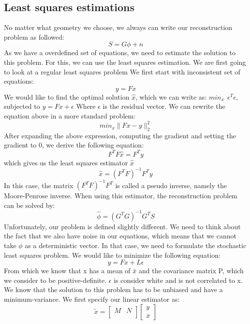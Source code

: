 \documentclass{article}
\begin{document}
\subsection{Least squares estimations}
No matter what geometry we choose, we always can write our reconstruction problem as followed:
$$ S=G\phi +n$$
As we have a overdefined set of equations, we need to estimate the solution to this problem. For this, we can use the least squares estimation. We are first going to look at a regular least squares problem
\newline
\newline
We first start with inconsistent set of equations:
$$ y=Fx $$
We would like to find the optimal solution $\hat{x}$, which we can write as:
\newline
\newline
$ min_x \ \ \epsilon^T \epsilon $, subjected to $ y=Fx + \epsilon$
\newline
\newline
Where $\epsilon$ is the residual vector. We can rewrite the equation above in a more standard problem:
$$ min_x\|Fx-y\|_2^2$$ 
After expanding the above expression, computing the gradient and setting the gradient to 0, we derive the following equation:
$$ F^TF\hat{x}=F^Ty $$
which gives us the least squares estimator $\hat{x}$
$$ \hat{x} = (F^TF)^{-1}F^Ty $$
In this case, the matrix $(F^TF)^{-1}F^T$ is called a pseudo inverse, namely the Moore-Penrose inverse.
When using this estimator, the reconstruction problem can be solved by:
$$ \hat{\phi} = (G^TG)^{-1}G^TS  $$
\newline
\newline
Unfortunately, our problem is defined slightly different. We need to think about the fact that we also have noise in our equations, which means that we cannot take $\phi$ as a deterministic vector. In that case, we need to formulate the stochastic least squares problem. We would like to minimize the following equation:
$$ y=Fx+L\epsilon$$
From which we know that x has a mean of $\bar{x}$ and the covariance matrix P, which we consider to be positive-definite.
$\epsilon$ is consider white and is not correlated to x. We know that the solution to this problem has to be unbiased and have a minimum-variance. We first specify our linear estimator as:
$$ \tilde{x} = 
\begin{bmatrix}
M & N \\
\end{bmatrix}
\begin{bmatrix}
y \\
\bar{x}
\end{bmatrix}
$$
\end{document}

